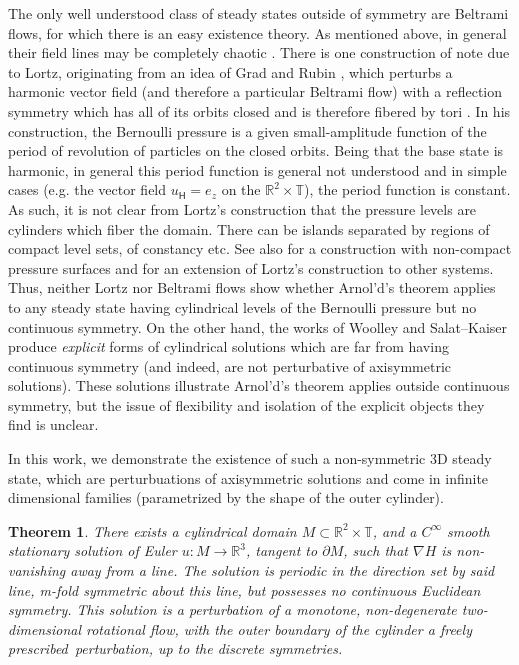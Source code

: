 \documentclass[11pt]{article}
\theoremstyle{plain}
\numberwithin{equation}{section}
\newtheorem{thm}{Theorem}
\theoremstyle{remark}
\begin{document}
The only well understood class of steady states outside of symmetry are Beltrami flows, for which there is an easy existence theory. As mentioned above, in general their field lines may be completely chaotic \cite{EP12, EP23}. There is one construction of note due to Lortz, originating from an idea of  Grad and Rubin \cite{G3}, which perturbs a harmonic vector field (and therefore a particular Beltrami flow) with a reflection symmetry which has all of its orbits closed and is therefore fibered by tori  \cite{L70}.  In his construction, the Bernoulli pressure is a given small-amplitude function of the period of revolution of particles on the closed orbits.  Being that the base state is harmonic, in general this period function is general not understood and in simple cases (e.g. the vector field $u_\mathsf{H}=e_z$ on the $\mathbb{R}^2\times \mathbb{T}$), the period function is constant.  As such, it is not clear from Lortz's construction that the pressure levels are cylinders which fiber the domain.  There can be islands separated by regions of compact level sets, of constancy etc.  See also \cite{WS20} for a construction with non-compact pressure surfaces and \cite{SVW} for an extension of Lortz's construction to other systems. Thus, neither Lortz nor Beltrami flows show whether Arnol'd's theorem applies to any steady state having cylindrical levels of the Bernoulli pressure but no continuous symmetry.  On the other hand, the works of Woolley \cite{W77} and Salat--Kaiser \cite{SK95,KS97} produce \emph{explicit} forms of cylindrical solutions which are far from having continuous symmetry (and indeed, are not perturbative of axisymmetric solutions). These solutions illustrate  Arnol'd's theorem applies outside continuous symmetry, but the issue of flexibility and isolation of the explicit objects they find is unclear.

In this work, we demonstrate the existence of such a non-symmetric 3D steady state, which are perturbuations of axisymmetric solutions and come in infinite dimensional families (parametrized by the shape of the outer cylinder).

\begin{thm}
    \label{mainthm}
There exists a cylindrical domain $M\subset \mathbb{R}^2\times \mathbb{T}$, and a $C^\infty$ smooth stationary solution of Euler $u:M\to \mathbb{R}^3$, tangent to $\partial M$,  such that $\nabla H$ is non-vanishing away from a line.  The solution is periodic in the direction set by said line, m-fold symmetric about this line, but possesses no continuous Euclidean symmetry. This solution is a perturbation of a monotone, non-degenerate two-dimensional rotational flow, with the outer boundary of the cylinder a freely prescribed perturbation, up to the discrete symmetries.\end{thm}
\end{document}
